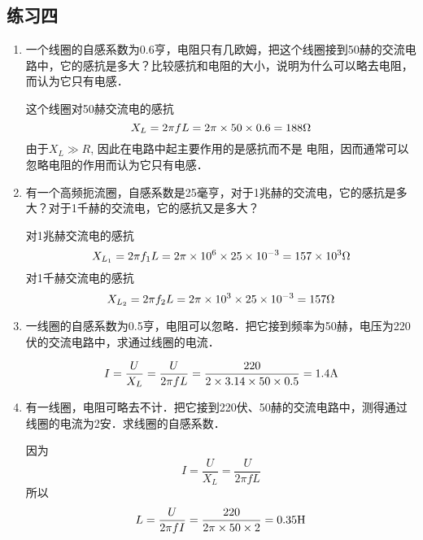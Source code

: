 \subsection{练习四}
\begin{enumerate}
    \item 一个线圈的自感系数为0.6亨，电阻只有几欧姆，把这个线圈接到50赫的交流电路中，它的感抗是多大？比较感抗和电阻的大小，说明为什么可以略去电阻，而认为它只有电感．


    \begin{solution}
        这个线圈对50赫交流电的感抗
    \[    X_L=2\pi fL=2\pi \times50\times0.6=188\Omega\]
        由于$X_L\gg R$, 因此在电路中起主要作用的是感抗而不是
        电阻，因而通常可以忽略电阻的作用而认为它只有电感．
    \end{solution}
    
    \item 有一个高频扼流圈，自感系数是25毫亨，对于1兆赫的交流电，它的感抗是多大？对于1千赫的交流电，它的感抗又是多大？


    \begin{solution}
        对1兆赫交流电的感抗
        \[X_{L_1}=2\pi f_1L=2\pi\times10^6\times25\times10^{-3}=157\times10^3\Omega\]
        对1千赫交流电的感抗
        \[X_{L_2}=2\pi f_2L=2\pi\times10^3\times25\times10^{-3}=157\Omega\]
    \end{solution}
    
    \item 一线圈的自感系数为0.5亨，电阻可以忽略．把它接到频率为50赫，电压为220伏的交流电路中，求通过线圈的电流．


    \begin{solution}
 \[I=\frac{U}{X_L}=\frac{U}{2\pi fL}=\frac{220}{2\times 3.14\times 50\times 0.5}=1.4{\rm A}\]   
    \end{solution}
    
    \item 有一线圈，电阻可略去不计．把它接到220伏、50赫的交流电路中，测得通过线圈的电流为2安．求线圈的自感系数．


    \begin{solution}
    因为\[I=\frac{U}{X_L}=\frac{U}{2\pi fL }\]
    所以
    \[L=\frac{U}{2\pi fI}=\frac{220}{2\pi\times 50\times 2}=0.35{\rm H}\]
    \end{solution}
    
\end{enumerate}



